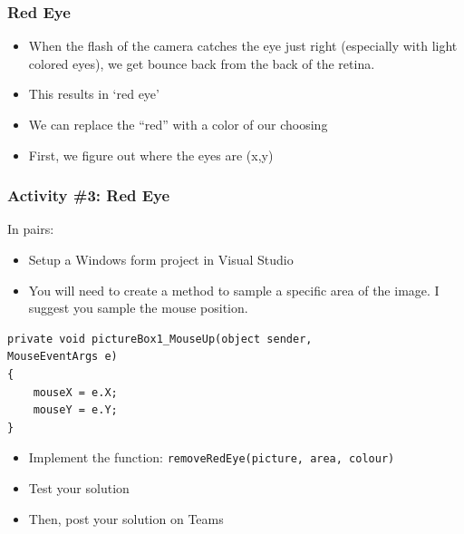 \begin{frame}
	\frametitle{Red Eye}
	
	\begin{itemize}		
		\item When the flash of the camera catches the eye just right (especially with light colored eyes), we get bounce back from the back of the retina.
		\item This results in `red eye'
		\item We can replace the “red” with a color of our choosing
		\item First, we figure out where the eyes are (x,y)
	\end{itemize}
\end{frame}


\begin{frame}[fragile]
	\frametitle{Activity \#3: Red Eye}
	
	In pairs:
	
	\vspace{1em}
	
	\begin{itemize}		
		\item Setup a Windows form project in Visual Studio
		\item You will need to create a method to sample a specific area of the image. I suggest you sample the mouse position.
		\end{itemize}
	\begin{lstlisting}
private void pictureBox1_MouseUp(object sender,
MouseEventArgs e)
{
	mouseX = e.X;
	mouseY = e.Y;
}
\end{lstlisting}
	\begin{itemize}	
		\item Implement the function: \texttt{removeRedEye(picture, area, colour)}
		\item Test your solution
		\item Then, post your solution on Teams
	\end{itemize}


\end{frame}


